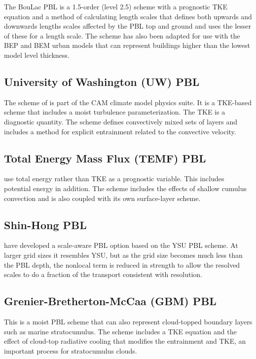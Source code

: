 The BouLac PBL \citep{bougeault89} is a 1.5-order (level 2.5) scheme with a prognostic TKE equation and a method of calculating length scales
that defines both upwards and downwards lengths scales affected by the PBL top and ground and uses the lesser of these for a length scale.
The scheme has also been adapted for use with the BEP and BEM urban models that can represent buildings higher than the lowest model level
thickness.

\subsection{University of Washington (UW) PBL}

The scheme of \citet{bretherton09} is part of the CAM climate model physics suite. It is a TKE-based scheme that includes a
moist turbulence parameterization. The TKE is a diagnostic quantity. The scheme defines convectively mixed sets of layers
and includes a method for explicit entrainment related to the convective velocity.

\subsection{Total Energy Mass Flux (TEMF) PBL}

\citet{angevine10} use total energy rather than TKE as a prognostic variable. This includes potential energy in addition.
The scheme includes the effects of shallow cumulus convection and is also coupled with its own surface-layer scheme.

\subsection{Shin-Hong PBL}

\citet{shin15} have developed a scale-aware PBL option based on the YSU PBL scheme. At larger grid sizes it
resembles YSU, but as the grid size becomes much less than the PBL depth, the nonlocal term is reduced in
strength to allow the resolved scales to do a fraction of the transport consistent with resolution.

\subsection{Grenier-Bretherton-McCaa (GBM) PBL}

This is a moist PBL scheme \citet{grenier01} that can also represent cloud-topped boundary layers such as marine stratocumulus.
The scheme includes a TKE equation and the effect of cloud-top radiative cooling that modifies the entrainment
and TKE, an important process for stratocumulus clouds.


